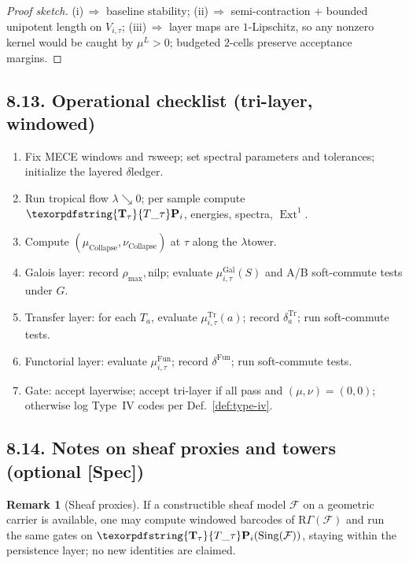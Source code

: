 \documentclass[11pt]{article}
\numberwithin{equation}{section}
\theoremstyle{plain}
\theoremstyle{definition}
\theoremstyle{remark}
\DeclareMathOperator{\Ext}{Ext}
\DeclareRobustCommand{\hyp}{\nobreakdash-}
\theoremstyle{plain}
\theoremstyle{definition}
\numberwithin{equation}{section}
\theoremstyle{definition}
\newtheorem{remark}[theorem]{Remark}
\DeclareRobustCommand{\Ttau}{\texorpdfstring{\ensuremath{\mathbf{T}_{\tau}}}{T\_\tau}}
\numberwithin{equation}{section}
\theoremstyle{plain}
\theoremstyle{definition}
\theoremstyle{remark}
\providecommand{\Tfun}[1]{\mathbf{T}_{#1}}
\providecommand{\Ttau}{\Tfun{\tau}}
\begin{document}
\begin{proof}[Proof sketch]
(i)\,\(\Rightarrow\) baseline stability; (ii)\,\(\Rightarrow\) semi\hyp contraction + bounded unipotent length on \(V_{i,\tau}\); (iii)\,\(\Rightarrow\) layer maps are $1$\hyp Lipschitz, so any nonzero kernel would be caught by \(\mu^L>0\); budgeted $2$\hyp cells preserve acceptance margins.
\end{proof}

\subsection*{8.13. Operational checklist (tri-layer, windowed)}
\begin{enumerate}
  \item Fix MECE windows and \(\tau\)\nobreakdash sweep; set spectral parameters and tolerances; initialize the layered \(\delta\)\nobreakdash ledger.
  \item Run tropical flow \(\lambda\searrow 0\); per sample compute \(\Ttau\mathbf{P}_i\), energies, spectra, \(\Ext^1\).
  \item Compute \((\mu_{\mathrm{Collapse}},\nu_{\mathrm{Collapse}})\) at \(\tau\) along the \(\lambda\)\nobreakdash tower.
  \item Galois layer: record \(\rho_{\max},\mathrm{nilp}\); evaluate \(\mu^{\mathrm{Gal}}_{i,\tau}(S)\) and A/B soft\hyp commute tests under \(G\).
  \item Transfer layer: for each \(T_a\), evaluate \(\mu^{\mathrm{Tr}}_{i,\tau}(a)\); record \(\delta^{\mathrm{Tr}}_a\); run soft\hyp commute tests.
  \item Functorial layer: evaluate \(\mu^{\mathrm{Fun}}_{i,\tau}\); record \(\delta^{\mathrm{Fun}}\); run soft\hyp commute tests.
  \item Gate: accept layerwise; accept tri\hyp layer if all pass and \((\mu,\nu)=(0,0)\); otherwise log Type~IV codes per Def.~\ref{def:type-iv}.
\end{enumerate}

\subsection*{8.14. Notes on sheaf proxies and towers (optional \textbf{[Spec]})}
\begin{remark}[Sheaf proxies]
If a constructible sheaf model \(\mathcal{F}\) on a geometric carrier is available, one may compute windowed barcodes of \(\mathrm{R}\Gamma(\mathcal{F})\) and run the same gates on \(\Ttau\mathbf{P}_i(\mathrm{Sing}(\mathcal{F}))\), staying within the persistence layer; no new identities are claimed.
\end{remark}
\end{document}

